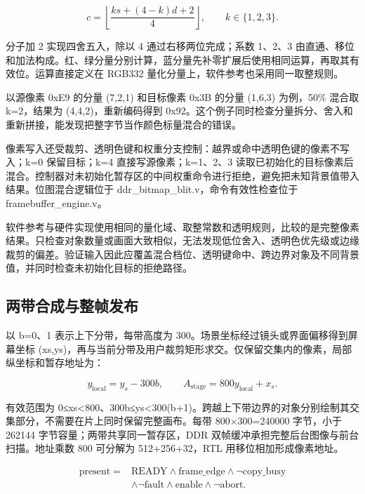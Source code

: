 \documentclass[UTF8,a4paper,12pt]{ctexart}
\begin{document}
\[
c=\left\lfloor\frac{k s+(4-k)d+2}{4}\right\rfloor,\qquad k\in\{1,2,3\}.
\]

分子加 2 实现四舍五入，除以 4 通过右移两位完成；系数 1、2、3 由直通、移位和加法构成。红、绿分量分别计算，蓝分量先补零扩展后使用相同运算，再取其有效位。运算直接定义在 RGB332 量化分量上，软件参考也采用同一取整规则。\par

以源像素 0xE9 的分量 (7,2,1) 和目标像素 0x3B 的分量 (1,6,3) 为例，50\% 混合取 k=2，结果为 (4,4,2)，重新编码得到 0x92。这个例子同时检查分量拆分、舍入和重新拼接，能发现把整字节当作颜色标量混合的错误。\par

像素写入还受裁剪、透明色键和权重分支控制：越界或命中透明色键的像素不写入；k=0 保留目标；k=4 直接写源像素；k=1、2、3 读取已初始化的目标像素后混合。控制器对未初始化暂存区的中间权重命令进行拒绝，避免把未知背景值带入结果。位图混合逻辑位于 ddr\_bitmap\_blit.v，命令有效性检查位于 framebuffer\_engine.v。\par

软件参考与硬件实现使用相同的量化域、取整常数和透明规则，比较的是完整像素结果。只检查对象数量或画面大致相似，无法发现低位舍入、透明色优先级或边缘裁剪的偏差。验证输入因此应覆盖混合档位、透明键命中、跨边界对象及不同背景值，并同时检查未初始化目标的拒绝路径。\par

\subsection{两带合成与整帧发布}

以 b=0、1 表示上下分带，每带高度为 300。场景坐标经过镜头或界面偏移得到屏幕坐标 (xs,ys)，再与当前分带及用户裁剪矩形求交。仅保留交集内的像素，局部纵坐标和暂存地址为：\par

\[
y_{\mathrm{local}}=y_s-300b,\qquad A_{\mathrm{stage}}=800y_{\mathrm{local}}+x_s.
\]

有效范围为 0≤xs<800、300b≤ys<300(b+1)。跨越上下带边界的对象分别绘制其交集部分，不需要在片上同时保留完整画布。每带 800×300=240000 字节，小于 262144 字节容量；两带共享同一暂存区，DDR 双帧缓冲承担完整后台图像与前台扫描。地址乘数 800 可分解为 512+256+32，RTL 用移位相加形成像素地址。\par

\[
\begin{aligned}\mathrm{present}={}&\mathrm{READY}\land\mathrm{frame\_edge}\land\neg\mathrm{copy\_busy}\\&\land\neg\mathrm{fault}\land\mathrm{enable}\land\neg\mathrm{abort}.\end{aligned}
\]
\end{document}
